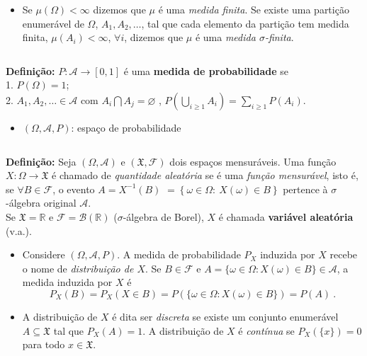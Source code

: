 \documentclass[
]{book}
\providecommand{\tightlist}{%
  \setlength{\itemsep}{0pt}\setlength{\parskip}{0pt}}
\begin{document}
\(~\)

\begin{itemize}
\tightlist
\item
  Se \(\mu(\Omega) < \infty\) dizemos que \(\mu\) é uma \emph{medida finita}. Se existe uma partição enumerável de \(\Omega\), \(A_1,A_2,\ldots\), tal que cada elemento da partição tem medida finita, \(\mu(A_i)<\infty\), \(\forall i\), dizemos que \(\mu\) é uma \emph{medida \(\sigma\)-finita}.
\end{itemize}

\(~\)

\textbf{Definição:} \(P: \mathcal{A} \longrightarrow [0,1]\) é uma \textbf{medida de probabilidade} se\\
1. \(P(\Omega) = 1\);\\
2. \(\displaystyle A_1, A_2, \ldots \in \mathcal{A}\) com \(A_i \bigcap A_j = \varnothing\) , \(\displaystyle P\left(\bigcup_{i \geq 1} A_i\right) = \sum_{i \geq 1} P\left(A_i\right)\).

\begin{itemize}
\tightlist
\item
  \((\Omega, \mathcal{A}, P)\): espaço de probabilidade
\end{itemize}

\(~\)

\textbf{Definição:} Seja \((\Omega,\mathcal{A})\) e \((\mathfrak{X},\mathcal{F})\) dois espaços mensuráveis. Uma função \(X: \Omega \longrightarrow \mathfrak{X}\) é chamado de \emph{quantidade aleatória} se é uma \emph{função mensurável}, isto é, se \(\forall B \in \mathcal{F}\), o evento \(A = X^{-1}(B)\) \(= \left\{\omega \in \Omega:~X(\omega)\in B\right\}\) pertence à \(\sigma\)-álgebra original \(\mathcal{A}\).\\
Se \(\mathfrak{X} = \mathbb{R}\) e \(\mathcal{F}=\mathcal{B}(\mathbb{R})\) (\(\sigma\)-álgebra de Borel), \(X\) é chamada \textbf{variável aleatória} (v.a.).

\begin{itemize}
\item
  Considere \((\Omega,\mathcal{A},P)\). A medida de probabilidade \(P_X\) induzida por \(X\) recebe o nome de \emph{distribuição de \(X\)}. Se \(B \in \mathcal{F}\) e \(A = \{\omega \in \Omega : X(\omega) \in B\} \in \mathcal{A}\), a medida induzida por \(X\) é
  \[P_X(B) = P_X\left(X \in B\right) = P\left(\{\omega \in \Omega :  X(\omega) \in B\}\right) = P(A)~.\]
\item
  A distribuição de \(X\) é dita ser \emph{discreta} se existe um conjunto enumerável \(A \subseteq \mathfrak{X}\) tal que \(P_X(A)=1\). A distribuição de \(X\) é \emph{contínua} se \(P_X\left(\{x\}\right)=0\) para todo \(x \in \mathfrak{X}\).
\end{itemize}
\end{document}
